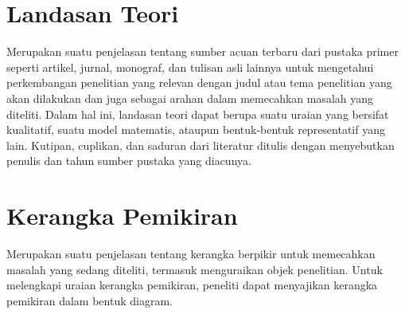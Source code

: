 \section{Landasan Teori}
\begin{sectioncontent}
    \hspace{\parindent}Merupakan suatu penjelasan tentang sumber acuan terbaru dari pustaka primer seperti artikel, jurnal, monograf, dan tulisan asli lainnya untuk mengetahui perkembangan penelitian yang relevan dengan judul atau tema penelitian yang akan dilakukan dan juga sebagai arahan dalam memecahkan masalah yang diteliti. Dalam hal ini, landasan teori dapat berupa suatu uraian yang bersifat kualitatif, suatu model matematis, ataupun bentuk-bentuk representatif yang lain. Kutipan, cuplikan, dan saduran dari literatur ditulis dengan menyebutkan penulis dan tahun sumber pustaka yang diacunya.
\end{sectioncontent}

\section{Kerangka Pemikiran}
\begin{sectioncontent}
    \hspace{\parindent}Merupakan suatu penjelasan tentang kerangka berpikir untuk memecahkan masalah yang sedang diteliti, termasuk menguraikan objek penelitian. Untuk melengkapi uraian kerangka pemikiran, peneliti dapat menyajikan kerangka pemikiran dalam bentuk diagram.
\end{sectioncontent}